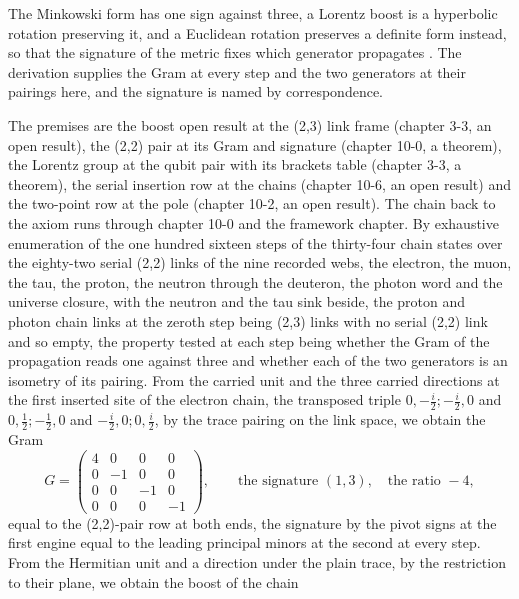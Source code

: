 \begin{chbridge}
The Minkowski form has one sign against three, a Lorentz boost is a hyperbolic rotation preserving it, and a Euclidean rotation preserves a definite form instead, so that the signature of the metric fixes which generator propagates \cite{Minkowski1908,Einstein1905}. The derivation supplies the Gram at every step and the two generators at their pairings here, and the signature is named by correspondence.
\end{chbridge}
\begin{chproof}
The premises are the boost open result at the (2,3) link frame (chapter 3-3, an open result), the (2,2) pair at its Gram and signature (chapter 10-0, a theorem), the Lorentz group at the qubit pair with its brackets table (chapter 3-3, a theorem), the serial insertion row at the chains (chapter 10-6, an open result) and the two-point row at the pole (chapter 10-2, an open result). The chain back to the axiom runs through chapter 10-0 and the framework chapter. By exhaustive enumeration of the one hundred sixteen steps of the thirty-four chain states over the eighty-two serial (2,2) links of the nine recorded webs, the electron, the muon, the tau, the proton, the neutron through the deuteron, the photon word and the universe closure, with the neutron and the tau sink beside, the proton and photon chain links at the zeroth step being (2,3) links with no serial (2,2) link and so empty, the property tested at each step being whether the Gram of the propagation reads one against three and whether each of the two generators is an isometry of its pairing. From the carried unit and the three carried directions at the first inserted site of the electron chain, the transposed triple $0,-\tfrac{i}{2};-\tfrac{i}{2},0$ and $0,\tfrac{1}{2};-\tfrac{1}{2},0$ and $-\tfrac{i}{2},0;0,\tfrac{i}{2}$, by the trace pairing on the link space, we obtain the Gram
\begin{equation}
G = \begin{pmatrix} 4 & 0 & 0 & 0 \\ 0 & -1 & 0 & 0 \\ 0 & 0 & -1 & 0 \\ 0 & 0 & 0 & -1 \end{pmatrix} , \qquad \text{the signature } (1,3) , \quad \text{the ratio } -4 ,
\end{equation}
equal to the (2,2)-pair row at both ends, the signature by the pivot signs at the first engine equal to the leading principal minors at the second at every step. From the Hermitian unit and a direction under the plain trace, by the restriction to their plane, we obtain the boost of the chain

\end{chproof}
